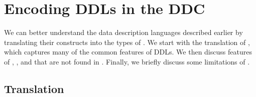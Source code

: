 \section{Encoding DDLs in the DDC}
\label{sec:encodings}

We can better understand the data description languages described
earlier by translating their constructs into the types of \ddc{}. We
start with the translation of \ipads{}, which captures many of the
common features of DDLs. We then discuss features of \pads{},
\datascript{}, and \packettypes{} that are not found in \ipads{}.
Finally, we briefly discuss some limitations of \ddc{}.

\subsection{\ipads{} Translation}
\label{sec:trans-sl}

